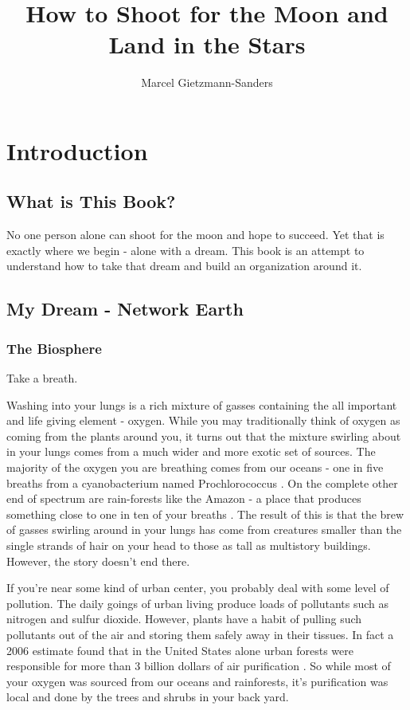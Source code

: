\documentclass[11pt]{book}
\title{How to Shoot for the Moon and Land in the Stars}
\author{Marcel Gietzmann-Sanders}
\date{}
\begin{document}
\maketitle
\tableofcontents
\newpage
\part{Introduction}
\chapter{What is This Book?}
No one person alone can shoot for the moon and hope to succeed. Yet that is exactly where we begin - alone with a dream. This book is an attempt to understand how to take that dream and build an organization around it.
\chapter{My Dream - Network Earth}
\section{The Biosphere}
Take a breath. 
\newline

Washing into your lungs is a rich mixture of gasses containing the all important and life giving element - oxygen. While you may traditionally think of oxygen as coming from the plants around you, it turns out that the mixture swirling about in your lungs comes from a much wider and more exotic set of sources. The majority of the oxygen you are breathing comes from our oceans - one in five breaths from a cyanobacterium named Prochlorococcus \cite{kmorsink}. On the complete other end of spectrum are rain-forests like the Amazon - a place that produces something close to one in ten of your breaths \cite{ymalhi}. The result of this is that the brew of gasses swirling around in your lungs has come from creatures smaller than the single strands of hair on your head to those as tall as multistory buildings. However, the story doesn't end there.
\newline

If you're near some kind of urban center, you probably deal with some level of pollution. The daily goings of urban living produce loads of pollutants such as nitrogen and sulfur dioxide. However, plants have a habit of pulling such pollutants out of the air and storing them safely away in their tissues. In fact a 2006 estimate found that in the United States alone urban forests were responsible for more than 3 billion dollars of air purification \cite{dnowak}. So while most of your oxygen was sourced from our oceans and rainforests, it's purification was local and done by the trees and shrubs in your back yard. 
\newline
\end{document}
